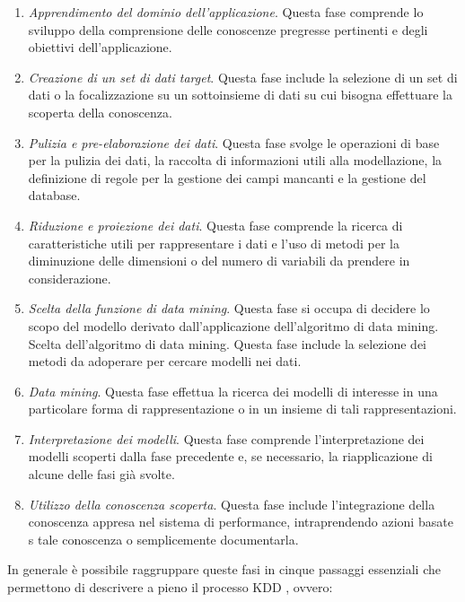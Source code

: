 \begin{enumerate}
    \item \textit{Apprendimento del dominio dell'applicazione}. Questa fase comprende lo sviluppo della comprensione delle conoscenze pregresse pertinenti e degli obiettivi dell'applicazione.
    \item \textit{Creazione di un set di dati target}. Questa fase include la selezione di un set di dati o la focalizzazione su un sottoinsieme di dati su cui bisogna effettuare la scoperta della conoscenza.
    \item \textit{Pulizia e pre-elaborazione dei dati}. Questa fase svolge le operazioni di base per la pulizia dei dati, la raccolta di informazioni utili alla modellazione, la definizione di regole per la gestione dei campi mancanti e la gestione del database.
    \item \textit{Riduzione e proiezione dei dati}. Questa fase comprende la ricerca di caratteristiche utili per rappresentare i dati e l'uso di metodi per la diminuzione delle dimensioni o del numero di variabili da prendere in considerazione.
    \item \textit{Scelta della funzione di data mining}. Questa fase si occupa di decidere lo scopo del modello derivato dall'applicazione dell'algoritmo di data mining.
    Scelta dell'algoritmo di data mining. Questa fase include la selezione dei metodi da adoperare per cercare modelli nei dati.
    \item \textit{Data mining}. Questa fase effettua la ricerca dei modelli di interesse in una particolare forma di rappresentazione o in un insieme di tali rappresentazioni.
    \item \textit{Interpretazione dei modelli}. Questa fase comprende l'interpretazione dei modelli scoperti dalla fase precedente e, se necessario, la riapplicazione di alcune delle fasi già svolte.
    \item \textit{Utilizzo della conoscenza scoperta}. Questa fase include l'integrazione della conoscenza appresa nel sistema di performance, intraprendendo azioni basate s tale conoscenza o semplicemente documentarla.
\end{enumerate}

In generale è possibile raggruppare queste fasi in cinque passaggi essenziali che permettono di descrivere a pieno il processo KDD \cite{knowledge_science}, ovvero:

